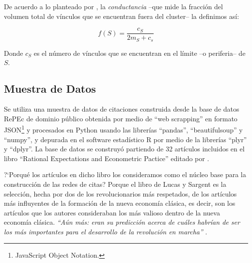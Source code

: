 \documentclass[12pt,letter]{article}
\begin{document}
\vspace{0.5cm}

De acuerdo a lo planteado por \cite{Yang}, la \emph{conductancia} --que mide la fracción del volumen total de vínculos que se encuentran fuera del cluster-- la definimos así:

\begin{equation}
f(S)=\frac{c_S}{2m_S + c_s}
\end{equation}

Donde $c_S$ es el número de vínculos que se encuentran en el límite --o periferia-- de $S$.

\subsection{Muestra de Datos}

Se utiliza una muestra de datos de citaciones construida desde la base de datos RePEc de dominio público obtenida por medio de ``web scrapping'' en formato JSON\footnote{JavaScript Object Notation.} y procesados en Python usando las librerías ``pandas'', ``beautifulsoup'' y ``numpy'', y depurada en el software estadístico R por medio de la librerías ``plyr'' y ``dplyr''. La base de datos se construyó partiendo de 32 artículos incluidos en el libro ``Rational Expectations and Econometric Pactice'' editado por \cite{Lucas2}.

\vspace{0.5cm}

?`Porqué los artículos en dicho libro los consideramos como el núcleo base para la construcción de las redes de citas? Porque el libro de Lucas y Sargent es la selección, hecha por dos de los revolucionarios más respetados, de los artículos más influyentes de la formación de la nueva economía clásica, es decir, son los artículos que los autores consideraban los más valioso dentro de la nueva economía clásica. {\it ``Aún más: eran su predicción acerca de cuáles habrían de ser los más importantes para el desarrollo de la revolución en marcha''} \citep[Pág. 48]{Salazar1}.

\vspace{0.5cm}
\end{document}
